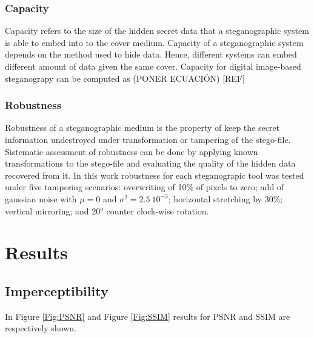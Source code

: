 \documentclass[11pt]{article}
\begin{document}
\subsubsection{Capacity}

Capacity refers to the size of the hidden secret data that a steganographic system is able to embed into to the cover
medium. Capacity of a steganographic system depends on the method used to hide data. Hence, different systems can embed
different amount of data given the same cover. Capacity for digital image-based steganograpy can be computed as 
(PONER ECUACIÓN) [REF]


\subsubsection{Robustness}
\label{Subsubsec:Robustness}

Robustness of a steganographic medium is the property of keep the secret information undestroyed under transformation or 
tampering of the stego-file. Sistematic assessment of robustness can be done by applying known transformations to the stego-file
and evaluating the quality of the hidden data recovered from it. In this work robustness for each steganograpic tool 
was tested under five tampering scenarios: overwriting of 10\% of pixels to zero; add of gaussian noise with $\mu = 0$ and $\sigma^2 = 2.5\ 10^{-3}$; horizontal
stretching by 30\%; vertical mirroring; and 20$^o$ counter clock-wise rotation.


\section{Results}


\subsection{Imperceptibility}

In Figure \ref{Fig:PSNR} and Figure \ref{Fig:SSIM} results for PSNR and SSIM are respectively shown.
\end{document}
